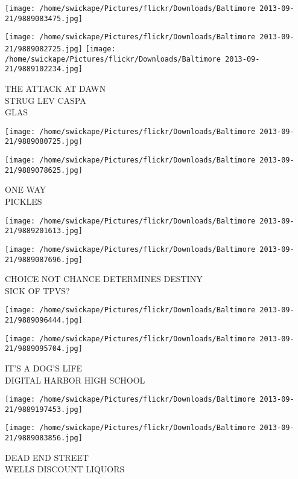 \documentclass[10pt,letterpaper]{article}
\begin{document}
\texttt{[image: /home/swickape/Pictures/flickr/Downloads/Baltimore 2013-09-21/9889083475.jpg]}

\vspace{0.25in}
\texttt{[image: /home/swickape/Pictures/flickr/Downloads/Baltimore 2013-09-21/9889082725.jpg]}
\texttt{[image: /home/swickape/Pictures/flickr/Downloads/Baltimore 2013-09-21/9889102234.jpg]}

THE ATTACK AT DAWN\\
STRUG LEV CASPA\\
GLAS
\pagebreak

\texttt{[image: /home/swickape/Pictures/flickr/Downloads/Baltimore 2013-09-21/9889080725.jpg]}

\vspace{0.25in}
\texttt{[image: /home/swickape/Pictures/flickr/Downloads/Baltimore 2013-09-21/9889078625.jpg]}

ONE WAY\\
PICKLES
\pagebreak

\texttt{[image: /home/swickape/Pictures/flickr/Downloads/Baltimore 2013-09-21/9889201613.jpg]}

\vspace{0.25in}
\texttt{[image: /home/swickape/Pictures/flickr/Downloads/Baltimore 2013-09-21/9889087696.jpg]}

CHOICE NOT CHANCE DETERMINES DESTINY\\
SICK OF TPVS?
\pagebreak

\texttt{[image: /home/swickape/Pictures/flickr/Downloads/Baltimore 2013-09-21/9889096444.jpg]}

\vspace{0.25in}
\texttt{[image: /home/swickape/Pictures/flickr/Downloads/Baltimore 2013-09-21/9889095704.jpg]}

IT'S A DOG'S LIFE\\
DIGITAL HARBOR HIGH SCHOOL
\pagebreak

\texttt{[image: /home/swickape/Pictures/flickr/Downloads/Baltimore 2013-09-21/9889197453.jpg]}

\vspace{0.25in}
\texttt{[image: /home/swickape/Pictures/flickr/Downloads/Baltimore 2013-09-21/9889083856.jpg]}

DEAD END STREET\\
WELLS DISCOUNT LIQUORS
\pagebreak
\end{document}
